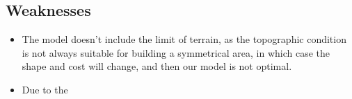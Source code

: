 \documentclass{mcmthesis}
\begin{document}
\subsection{Weaknesses}
\begin{itemize}
\item The model doesn't include the limit of terrain, as the topographic condition is not always suitable for building a symmetrical area, in which case the shape and cost will change, and then our model is not optimal.
\item Due to the 




\end{itemize}

\clearpage


\nocite{*}



\clearpage
\end{document}
